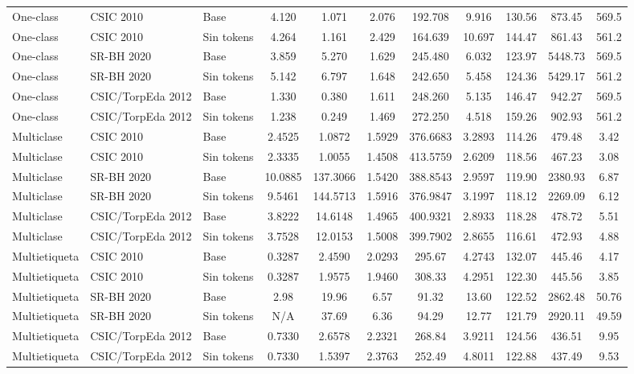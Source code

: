 \documentclass[12pt,oneside]{report}
\begin{document}
\begin{table}[H]
\begin{adjustbox}{max width=\textwidth}
\begin{tabular}{lllcccccccc}
One-class & CSIC 2010 & Base & 4.120 & 1.071 & 2.076 & 192.708 & 9.916 & 130.56 & 873.45 & 569.5 \\One-class & CSIC 2010 & Sin tokens & 4.264 & 1.161 & 2.429 & 164.639 & 10.697 & 144.47 & 861.43 & 561.2 \\One-class & SR-BH 2020 & Base & 3.859 & 5.270 & 1.629 & 245.480 & 6.032 & 123.97 & 5448.73 & 569.5 \\One-class & SR-BH 2020 & Sin tokens & 5.142 & 6.797 & 1.648 & 242.650 & 5.458 & 124.36 & 5429.17 & 561.2 \\One-class & CSIC/TorpEda 2012 & Base & 1.330 & 0.380 & 1.611 & 248.260 & 5.135 & 146.47 & 942.27 & 569.5 \\One-class & CSIC/TorpEda 2012 & Sin tokens & 1.238 & 0.249 & 1.469 & 272.250 & 4.518 & 159.26 & 902.93 & 561.2 \\Multiclase & CSIC 2010 & Base & 2.4525 & 1.0872 & 1.5929 & 376.6683 & 3.2893 & 114.26 & 479.48 & 3.42 \\Multiclase & CSIC 2010 & Sin tokens & 2.3335 & 1.0055 & 1.4508 & 413.5759 & 2.6209 & 118.56 & 467.23 & 3.08 \\Multiclase & SR-BH 2020 & Base & 10.0885 & 137.3066 & 1.5420 & 388.8543 & 2.9597 & 119.90 & 2380.93 & 6.87 \\Multiclase & SR-BH 2020 & Sin tokens & 9.5461 & 144.5713 & 1.5916 & 376.9847 & 3.1997 & 118.12 & 2269.09 & 6.12 \\Multiclase & CSIC/TorpEda 2012 & Base & 3.8222 & 14.6148 & 1.4965 & 400.9321 & 2.8933 & 118.28 & 478.72 & 5.51 \\Multiclase & CSIC/TorpEda 2012 & Sin tokens & 3.7528 & 12.0153 & 1.5008 & 399.7902 & 2.8655 & 116.61 & 472.93 & 4.88 \\Multietiqueta & CSIC 2010 & Base & 0.3287 & 2.4590 & 2.0293 & 295.67 & 4.2743 & 132.07 & 445.46 & 4.17 \\Multietiqueta & CSIC 2010 & Sin tokens & 0.3287 & 1.9575 & 1.9460 & 308.33 & 4.2951 & 122.30 & 445.56 & 3.85 \\Multietiqueta & SR-BH 2020 & Base & 2.98 & 19.96 & 6.57 & 91.32 & 13.60 & 122.52 & 2862.48 & 50.76 \\Multietiqueta & SR-BH 2020 & Sin tokens & N/A & 37.69 & 6.36 & 94.29 & 12.77 & 121.79 & 2920.11 & 49.59 \\Multietiqueta & CSIC/TorpEda 2012 & Base & 0.7330 & 2.6578 & 2.2321 & 268.84 & 3.9211 & 124.56 & 436.51 & 9.95 \\Multietiqueta & CSIC/TorpEda 2012 & Sin tokens & 0.7330 & 1.5397 & 2.3763 & 252.49 & 4.8011 & 122.88 & 437.49 & 9.53 \\\bottomrule
\end{tabular}
\end{adjustbox}
\end{table}
\end{document}
